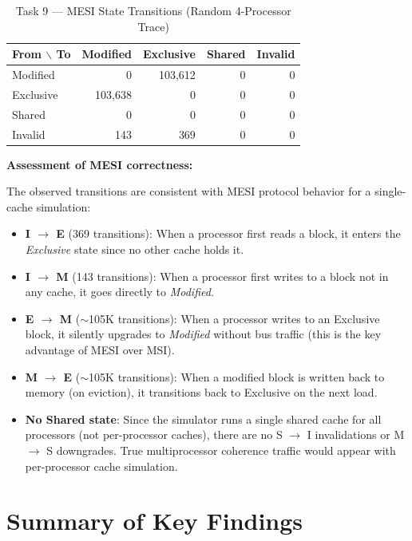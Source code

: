 \documentclass[12pt,a4paper]{article}
\begin{document}
\begin{table}[H]
\centering
\caption{Task 9 --- MESI State Transitions (Random 4-Processor Trace)}
\begin{tabular}{lrrrr}
\toprule
\textbf{From $\backslash$ To} & \textbf{Modified} & \textbf{Exclusive} & \textbf{Shared} & \textbf{Invalid} \\
\midrule
Modified  & 0      & 103,612 & 0 & 0 \\
Exclusive & 103,638& 0       & 0 & 0 \\
Shared    & 0      & 0       & 0 & 0 \\
Invalid   & 143    & 369     & 0 & 0 \\
\bottomrule
\end{tabular}
\end{table}

\textbf{Assessment of MESI correctness:}

The observed transitions are consistent with MESI protocol behavior for a single-cache simulation:

\begin{itemize}
    \item \textbf{I $\to$ E} (369 transitions): When a processor first reads a block, it enters the \textit{Exclusive} state since no other cache holds it.
    \item \textbf{I $\to$ M} (143 transitions): When a processor first writes to a block not in any cache, it goes directly to \textit{Modified}.
    \item \textbf{E $\to$ M} ($\sim$105K transitions): When a processor writes to an Exclusive block, it silently upgrades to \textit{Modified} without bus traffic (this is the key advantage of MESI over MSI).
    \item \textbf{M $\to$ E} ($\sim$105K transitions): When a modified block is written back to memory (on eviction), it transitions back to Exclusive on the next load.
    \item \textbf{No Shared state}: Since the simulator runs a single shared cache for all processors (not per-processor caches), there are no S $\to$ I invalidations or M $\to$ S downgrades. True multiprocessor coherence traffic would appear with per-processor cache simulation.
\end{itemize}

\section{Summary of Key Findings}
\end{document}
